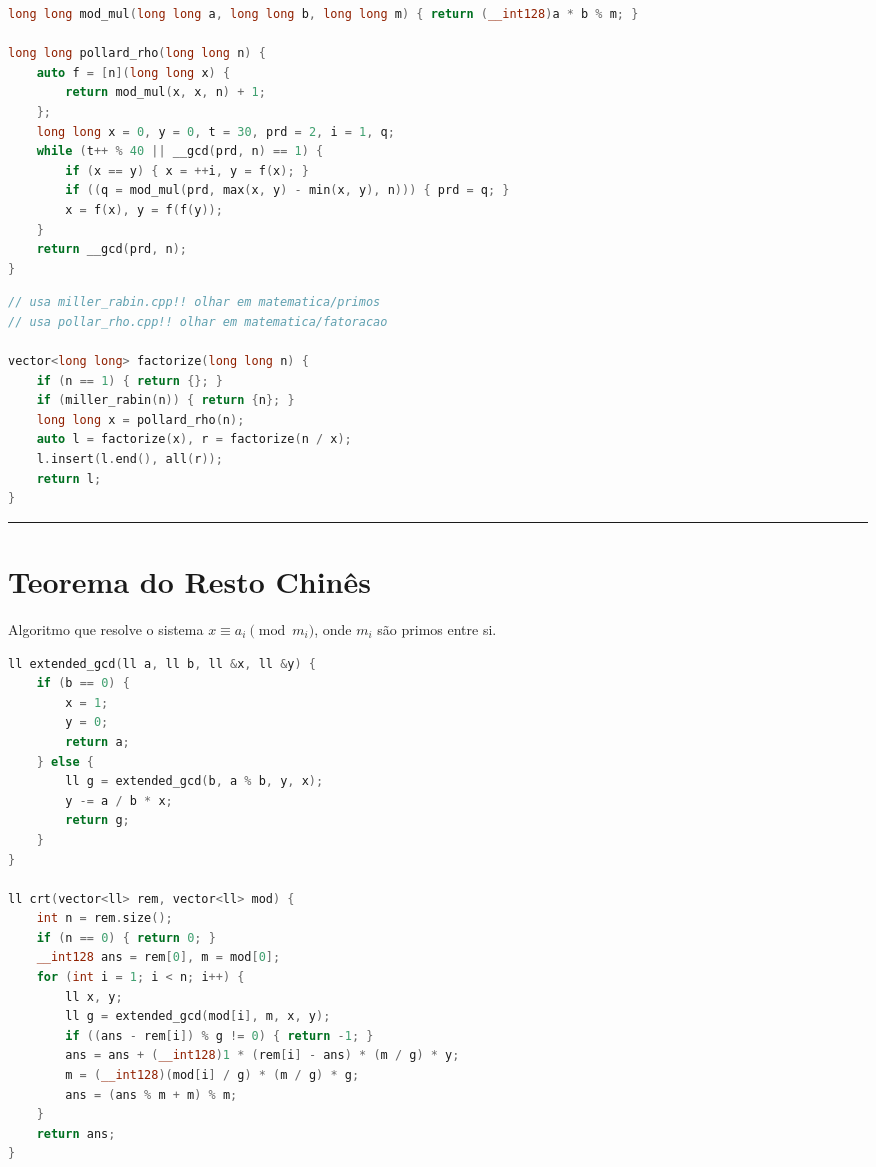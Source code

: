 \documentclass[11pt, a4paper, twoside]{book}
\begin{document}
\hfill

\begin{lstlisting}[language=C++]
long long mod_mul(long long a, long long b, long long m) { return (__int128)a * b % m; }

long long pollard_rho(long long n) {
    auto f = [n](long long x) {
        return mod_mul(x, x, n) + 1;
    };
    long long x = 0, y = 0, t = 30, prd = 2, i = 1, q;
    while (t++ % 40 || __gcd(prd, n) == 1) {
        if (x == y) { x = ++i, y = f(x); }
        if ((q = mod_mul(prd, max(x, y) - min(x, y), n))) { prd = q; }
        x = f(x), y = f(f(y));
    }
    return __gcd(prd, n);
}
\end{lstlisting}

\hfill

\begin{multicols}{2}
\begin{lstlisting}[language=C++]
// usa miller_rabin.cpp!! olhar em matematica/primos
// usa pollar_rho.cpp!! olhar em matematica/fatoracao

vector<long long> factorize(long long n) {
    if (n == 1) { return {}; }
    if (miller_rabin(n)) { return {n}; }
    long long x = pollard_rho(n);
    auto l = factorize(x), r = factorize(n / x);
    l.insert(l.end(), all(r));
    return l;
}
\end{lstlisting}
\end{multicols}

\hfill

\rule{\textwidth}{0.4pt}

\section{Teorema do Resto Chinês}



Algoritmo que resolve o sistema $x \equiv a_i \pmod{m_i}$, onde $m_i$ são primos entre si.



\textbf{} 

\hfill

\begin{lstlisting}[language=C++]
ll extended_gcd(ll a, ll b, ll &x, ll &y) {
    if (b == 0) {
        x = 1;
        y = 0;
        return a;
    } else {
        ll g = extended_gcd(b, a % b, y, x);
        y -= a / b * x;
        return g;
    }
}

ll crt(vector<ll> rem, vector<ll> mod) {
    int n = rem.size();
    if (n == 0) { return 0; }
    __int128 ans = rem[0], m = mod[0];
    for (int i = 1; i < n; i++) {
        ll x, y;
        ll g = extended_gcd(mod[i], m, x, y);
        if ((ans - rem[i]) % g != 0) { return -1; }
        ans = ans + (__int128)1 * (rem[i] - ans) * (m / g) * y;
        m = (__int128)(mod[i] / g) * (m / g) * g;
        ans = (ans % m + m) % m;
    }
    return ans;
}
\end{lstlisting}
\end{document}

